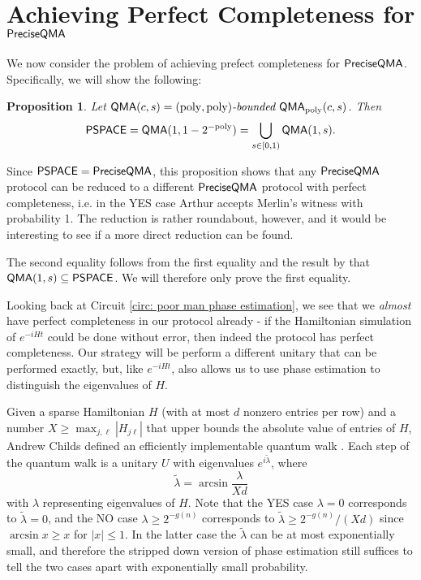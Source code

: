 \documentclass[11pt]{article}
\newtheorem{theorem}{Theorem}
\newtheorem{proposition}{Proposition}
\theoremstyle{definition}
\theoremstyle{remark}
\theoremstyle{definition}
\newtheorem{definition}{Definition}
\newcommand\QMA{{\sf{QMA}}}
\newcommand\PSPACE{{\sf{PSPACE}}}
\newcommand\QMAexp{{\sf{PreciseQMA}}}
\newcommand\bddQMA[5]{{\left(#1,#2\right)}\textit{-bounded }\QMA_{#3}(#4,#5)}
\newcommand\revPSPACE{{\sf{revPSPACE}}}
\newcommand{\poly}{\textrm{poly}}
\begin{document}
\section{Achieving Perfect Completeness for $\QMAexp$}\label{app:perfectcompleteness}
%
We now consider the problem of achieving prefect completeness for $\QMAexp$. Specifically, we will show the following:
\begin{proposition} Let $\QMA(c,s) = \bddQMA{\poly}{\poly}{\poly}{c}{s}$. Then
\[
\PSPACE = \QMA(1,1-2^{-\poly}) = \bigcup_{s \in [0,1)}\QMA(1,s).
\]
\end{proposition}
Since $\PSPACE = \QMAexp$, this proposition shows that any $\QMAexp$ protocol can be reduced to a different $\QMAexp$ protocol with perfect completeness, i.e. in the YES case Arthur accepts Merlin's witness with probability 1. The reduction is rather roundabout, however, and it would be interesting to see if a more direct reduction can be found.

The second equality follows from the first equality and the result by \cite{ikw12} that $\QMA(1,s) \subseteq \PSPACE$. We will therefore only prove the first equality.

Looking back at Circuit \ref{circ: poor man phase estimation}, we see that we \emph{almost} have perfect completeness in our protocol already - if the Hamiltonian simulation of $e^{-iHt}$ could be done without error, then indeed the protocol has perfect completeness. Our strategy will be perform a different unitary that can be performed exactly, but, like $e^{-iHt}$, also allows us to use phase estimation to distinguish the eigenvalues of $H$.

Given a sparse Hamiltonian $H$ (with at most $d$ nonzero entries per row) and a number $X \ge \max_{j,\ell}|H_{j\ell}|$ that upper bounds the absolute value of entries of $H$, Andrew Childs defined an efficiently implementable quantum walk \cite{berry14,childs10}. Each step of the quantum walk is a unitary $U$ with eigenvalues $e^{i\tilde{\lambda}}$, where 
\begin{equation}
\tilde{\lambda} = \arcsin \frac{\lambda}{Xd}
\end{equation}
with $\lambda$ representing eigenvalues of $H$. Note that the YES case $\lambda = 0$ corresponds to $\tilde{\lambda}=0$, and the NO case $\lambda \ge 2^{-g(n)}$ corresponds to $\tilde{\lambda} \ge 2^{-g(n)}/(Xd)$ since $\arcsin x \ge x$ for $|x| \le 1$. In the latter case the $\tilde{\lambda}$ can be at most exponentially small, and therefore the stripped down version of phase estimation still suffices to tell the two cases apart with exponentially small probability.
\end{document}
